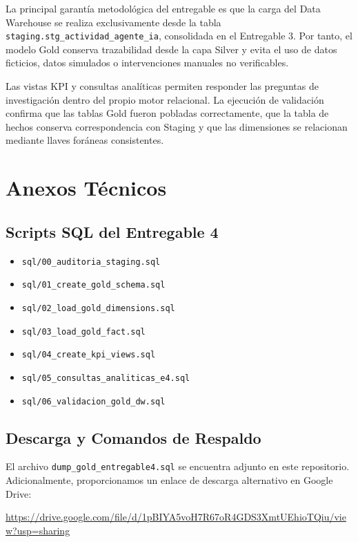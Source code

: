 \documentclass[12pt,a4paper]{article}
\newcommand{\StagingTabla}{\texttt{staging.\allowbreak stg\_actividad\_\allowbreak agente\_ia}}
\newcommand{\pathcode}[1]{\begingroup\scriptsize\ttfamily\nolinkurl{#1}\endgroup}
\begin{document}
La principal garant\'ia metodol\'ogica del entregable es que la carga del Data Warehouse se realiza exclusivamente desde la tabla \StagingTabla{}, consolidada en el Entregable 3. Por tanto, el modelo Gold conserva trazabilidad desde la capa Silver y evita el uso de datos ficticios, datos simulados o intervenciones manuales no verificables.

Las vistas KPI y consultas anal\'iticas permiten responder las preguntas de investigaci\'on dentro del propio motor relacional. La ejecuci\'on de validaci\'on confirma que las tablas Gold fueron pobladas correctamente, que la tabla de hechos conserva correspondencia con Staging y que las dimensiones se relacionan mediante llaves for\'aneas consistentes.

\section{Anexos T\'ecnicos}

\subsection{Scripts SQL del Entregable 4}

\begin{itemize}[leftmargin=1.2cm]
    \item \pathcode{sql/00_auditoria_staging.sql}
    \item \pathcode{sql/01_create_gold_schema.sql}
    \item \pathcode{sql/02_load_gold_dimensions.sql}
    \item \pathcode{sql/03_load_gold_fact.sql}
    \item \pathcode{sql/04_create_kpi_views.sql}
    \item \pathcode{sql/05_consultas_analiticas_e4.sql}
    \item \pathcode{sql/06_validacion_gold_dw.sql}
\end{itemize}

\subsection{Descarga y Comandos de Respaldo}

El archivo \pathcode{dump_gold_entregable4.sql} se encuentra adjunto en este repositorio. Adicionalmente, proporcionamos un enlace de descarga alternativo en Google Drive:

\url{https://drive.google.com/file/d/1pBIYA5voH7R67oR4GDS3XmtUEhioTQiu/view?usp=sharing}
\end{document}
